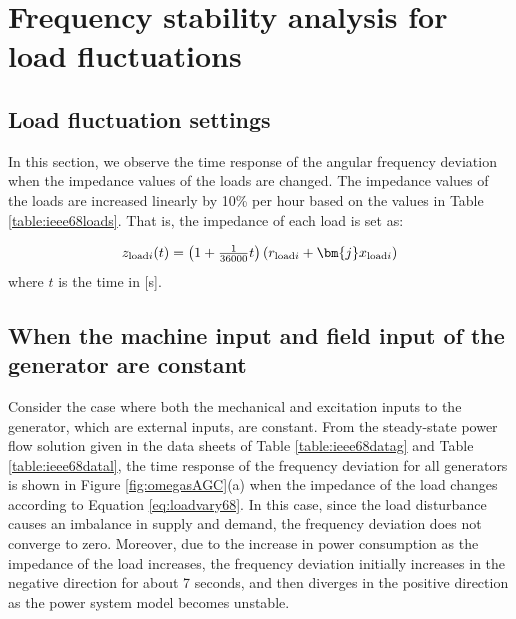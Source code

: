 \documentclass[graybox, envcountchap]{svmult}
\begin{document}
\section{Frequency stability analysis for load fluctuations}\label{sec:IEEE68AGC}

\subsection{Load fluctuation settings}

In this section, we observe the time response of the angular frequency deviation
when the impedance values of the loads are changed. The impedance values of the
loads are increased linearly by 10\% per hour based on the values in
Table \ref{table:ieee68loads}. That is, the impedance of each load is set as:

\begin{equation}\label{eq:loadvary68}
  z_{{\rm load}i}(t) = \left(1+\tfrac{1}{36000}t \right) \left( r_{{\rm load}i} + \bm{j} x_{{\rm load}i} \right)
\end{equation}
where $t$ is the time in [s].

\subsection{When the machine input and field input of the generator are constant}\label{sec:constPV}

Consider the case where both the mechanical and excitation inputs to the
generator, which are external inputs, are constant. From the steady-state power
flow solution given in the data sheets of Table \ref{table:ieee68datag} and
Table \ref{table:ieee68datal}, the time response of the frequency deviation for
all generators is shown in Figure \ref{fig:omegasAGC}(a) when the impedance of
the load changes according to Equation \ref{eq:loadvary68}. In this case, since
the load disturbance causes an imbalance in supply and demand, the frequency
deviation does not converge to zero. Moreover, due to the increase in power
consumption as the impedance of the load increases, the frequency deviation
initially increases in the negative direction for about 7 seconds, and then
diverges in the positive direction as the power system model becomes unstable.
\end{document}
